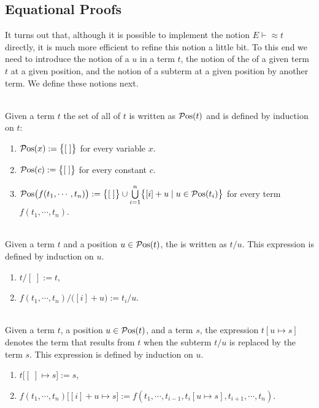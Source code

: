 \subsection{Equational Proofs}
It turns out that, although it is possible to implement the notion $E \vdash \approx t$ directly, it is much
more efficient to refine this notion a little bit.  To this end we need to introduce the notion of a
 $u$ in a term $t$, the notion of the  of a given term $t$ at a given position,
and the notion of  a subterm at a given position by another term.  We define these notions
next. 

\begin{Definition} \hspace*{\fill} \\
  Given a term $t$ the set of all  of $t$ is written as $\mathcal{P}\mathrm{os}(t)$ and is defined by
  induction on $t$:
  \begin{enumerate}
  \item $\mathcal{P}\mathrm{os}(x) := \bigl\{ [\;] \bigr\}$ \quad for every variable $x$.
  \item $\mathcal{P}\mathrm{os}(c) := \bigl\{ [\;] \bigr\}$ \quad for every constant $c$.
  \item $\mathcal{P}\mathrm{os}\bigl(f(t_1,\cdots,t_n)\bigr) := 
         \bigl\{ [\;] \bigr\} \cup \bigcup\limits_{i=1}^n \bigl\{ [i] + u \mid u \in \mathcal{P}\mathrm{os}(t_i) \bigr\}$ 
        \quad for every term $f(t_1,\cdots,t_n)$. \eoxs
  \end{enumerate}
\end{Definition}

\begin{Definition} \hspace*{\fill} \\
  Given a term $t$ and a position $u \in \mathcal{P}\mathrm{os}(t)$, the  is
  written as $t/u$.  This expression is defined by induction on $u$.
  \begin{enumerate}
  \item $t/[\;] := t$,
  \item $f(t_1,\cdots,t_n)/\bigl([i]+u\bigr) := t_i/u$.  \eoxs
  \end{enumerate}
\end{Definition}

\begin{Definition} \hspace*{\fill} \\
  Given a term $t$, a position $u \in \mathcal{P}\mathrm{os}(t)$, and a term $s$, the expression
  $t[u \mapsto s]$ denotes the term that results from $t$ when the subterm $t/u$ is replaced by the term 
  $s$.  This expression is defined by induction on $u$.
  \begin{enumerate}
  \item $t\bigl[ [\;] \mapsto s \bigr] := s$,
  \item $f(t_1,\cdots,t_n)\bigl[ [i]+u \mapsto s \bigr] := f(t_1, \cdots, t_{i-1},t_i[u \mapsto s], t_{i+1},\cdots, t_n)$.  
        \eoxs
  \end{enumerate}
\end{Definition}
  

